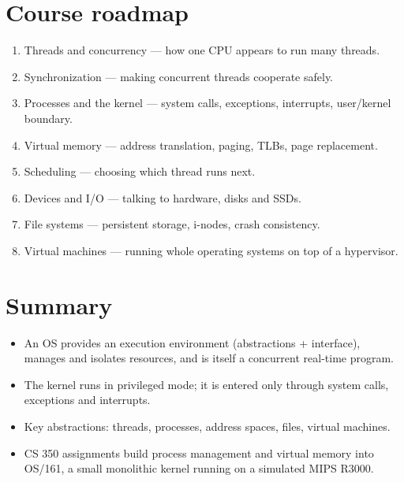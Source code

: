 \section{Course roadmap}

\begin{enumerate}
  \item Threads and concurrency --- how one CPU appears to run many threads.
  \item Synchronization --- making concurrent threads cooperate safely.
  \item Processes and the kernel --- system calls, exceptions, interrupts, user/kernel boundary.
  \item Virtual memory --- address translation, paging, TLBs, page replacement.
  \item Scheduling --- choosing which thread runs next.
  \item Devices and I/O --- talking to hardware, disks and SSDs.
  \item File systems --- persistent storage, i-nodes, crash consistency.
  \item Virtual machines --- running whole operating systems on top of a hypervisor.
\end{enumerate}

\section*{Summary}
\begin{itemize}
  \item An OS provides an execution environment (abstractions + interface), manages and
    isolates resources, and is itself a concurrent real-time program.
  \item The kernel runs in privileged mode; it is entered only through system calls,
    exceptions and interrupts.
  \item Key abstractions: threads, processes, address spaces, files, virtual machines.
  \item CS 350 assignments build process management and virtual memory into OS/161, a small
    monolithic kernel running on a simulated MIPS R3000.
\end{itemize}
